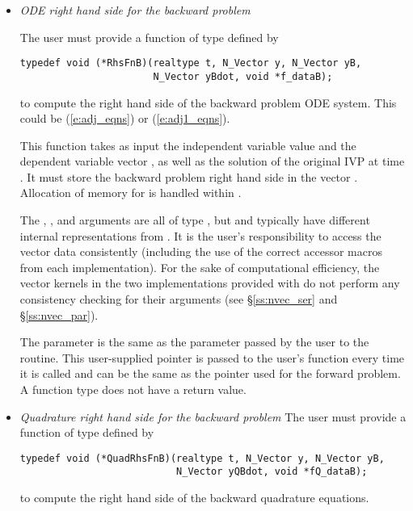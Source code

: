 \begin{itemize}

\item{\em ODE right hand side for the backward problem}

  The user must provide a function of type  defined by
\begin{verbatim}
typedef void (*RhsFnB)(realtype t, N_Vector y, N_Vector yB, 
                       N_Vector yBdot, void *f_dataB);
\end{verbatim}
  to compute the right hand side of the backward problem ODE system.
  This could be (\ref{e:adj_eqns}) or (\ref{e:adj1_eqns}).

  This function takes as input the 
  independent variable value  and the dependent variable vector ,
  as well as the solution of the original IVP  at time .  
  It must store the backward problem right hand side in the vector .  
  Allocation of memory for  is handled within {\cvodes}.
  
  The , , and  arguments are all of type ,
  but  and   typically have different internal representations
  from . It is the user's 
  responsibility to access the vector data consistently (including the use of the 
  correct accessor macros from each {\nvector} implementation). For the sake of 
  computational efficiency, the vector kernels in the two {\nvector} implementations 
  provided with {\cvodes} do not perform any consistency checking for their 
   arguments (see \S\ref{ss:nvec_ser} and \S\ref{ss:nvec_par}).

  The  parameter is the same as the  parameter passed by 
  the user to the  routine. This user-supplied pointer is passed to 
  the user's  function every time it is called and can be the same as the 
   pointer used for the forward problem.
  A  function type does not have a return value.

\item{\em Quadrature right hand side for the backward problem}
  The user must provide a function of type  defined by
\begin{verbatim}
typedef void (*QuadRhsFnB)(realtype t, N_Vector y, N_Vector yB, 
                           N_Vector yQBdot, void *fQ_dataB);
\end{verbatim}
  to compute the right hand side of the backward quadrature equations.


\end{itemize}
